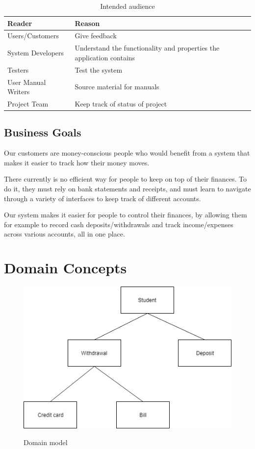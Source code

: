 \documentclass[12pt]{article}
\begin{document}
\begin{table}[htbp]
\caption{Intended audience}
\label{tab:intended_audience}
\begin{center}
  \begin{tabular}{|l|p{10cm}|}
      \hline
      Reader & Reason\\
      \hline\hline
      Users/Customers & Give feedback\\
      \hline
      System Developers & Understand the functionality and properties the application contains\\
      \hline
      Testers & Test the system\\
      \hline
      User Manual Writers & Source material for manuals\\
      \hline
      Project Team & Keep track of status of project\\
      \hline
  \end{tabular}
\end{center}
\end{table}

\subsection{Business Goals}
Our customers are money-conscious people who would benefit from a system that makes it easier to track how their money moves.

There currently is no efficient way for people to keep on top of their finances. To do it, they must rely on bank statements and receipts, and must learn to navigate through a variety of interfaces to keep track of different accounts. 

Our system makes it easier for people to control their finances, by allowing them for example to record cash deposits/withdrawals and track income/expenses across various accounts, all in one place.

\section{Domain Concepts}

\begin{figure}[h]
\centering
\caption{Domain model}
\includegraphics[width=160mm,natwidth=821,natheight=441]{model.jpg}
\label{fig:model}
\end{figure}
 
\end{document}

